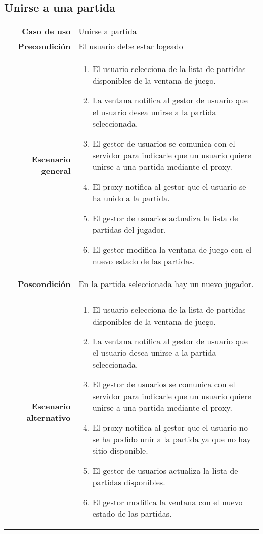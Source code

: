 \subsection{Unirse a una partida}
{\footnotesize
\begin{tabularx}{0.95\textwidth}{r|X}

\textbf{Caso de uso} & Unirse a partida \\

\textbf{Precondición} & El usuario debe estar logeado \\

\textbf{Escenario general} & \begin{enumerate}
\item El usuario selecciona de la lista de partidas disponibles de la ventana de juego.
\item La ventana notifica al gestor de usuario que el usuario desea unirse a la partida seleccionada.
\item El gestor de usuarios se comunica con el servidor para indicarle que un usuario quiere unirse a una partida mediante el proxy.
\item El proxy notifica al gestor que el usuario se ha unido a la partida.
\item El gestor de usuarios actualiza la lista de partidas del jugador.
\item El gestor modifica la ventana de juego con el nuevo estado de las partidas. 
\end{enumerate} \\

\textbf{Poscondición} & En la partida seleccionada hay un nuevo jugador.\\ \\

\textbf{Escenario alternativo} & \begin{enumerate}
\item El usuario selecciona de la lista de partidas disponibles de la ventana de juego.
\item La ventana notifica al gestor de usuario que el usuario desea unirse a la partida seleccionada.
\item El gestor de usuarios se comunica con el servidor para indicarle que un usuario quiere unirse a una partida mediante el proxy.
\item El proxy notifica al gestor que el usuario no se ha podido unir a la partida ya que no hay sitio disponible.
\item El gestor de usuarios actualiza la lista de partidas disponibles.
\item El gestor modifica la ventana con el nuevo estado de las partidas. 
\end{enumerate}

\end{tabularx}
}

